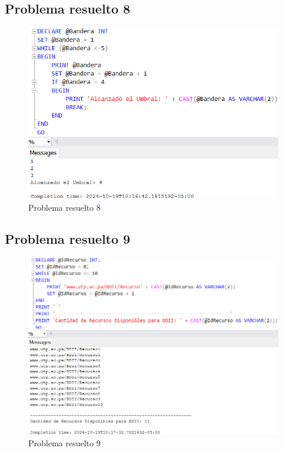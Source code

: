 \subsection{Problema resuelto 8}

\begin{figure}[H]
  \centering
  \includegraphics[scale = 0.5]{Imagenes/probs_resueltos/pr8.png}
  \caption{Problema resuelto 8}
\end{figure}

\subsection{Problema resuelto 9}

\begin{figure}[H]
  \centering
  \includegraphics[scale = 0.5]{Imagenes/probs_resueltos/pr9.png}
  \caption{Problema resuelto 9}
\end{figure}

